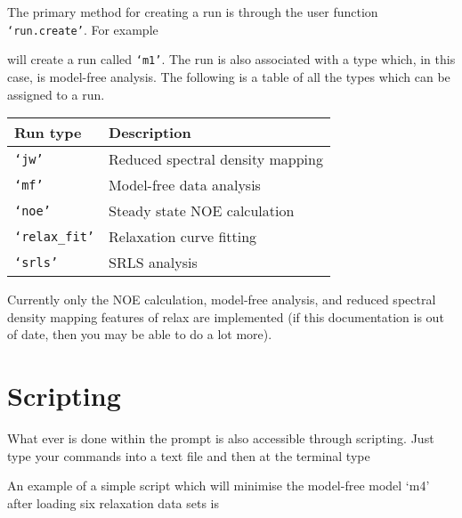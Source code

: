 The primary method for creating a run is through the user function \texttt{`run.create'}.  For example


will create a run called \texttt{`m1'}.  The run is also associated with a type which, in this case, is model-free analysis.  The following is a table of all the types which can be assigned to a run.

\begin{center}
\begin{tabular}{ll}
\toprule

Run type                & Description \\

\midrule

\texttt{`jw'}           & Reduced spectral density mapping \\
\texttt{`mf'}           & Model-free data analysis \\
\texttt{`noe'}          & Steady state NOE calculation \\
\texttt{`relax\_fit'}   & Relaxation curve fitting \\
\texttt{`srls'}         & SRLS analysis \\

\bottomrule
\end{tabular}
\end{center}

Currently only the NOE calculation, model-free analysis, and reduced spectral density mapping features of relax are implemented (if this documentation is out of date, then you may be able to do a lot more). 




\section{Scripting}

What ever is done within the prompt is also accessible through scripting.  Just type your commands into a text file and then at the terminal type


An example of a simple script which will minimise the model-free model `m4' after loading six relaxation data sets is

